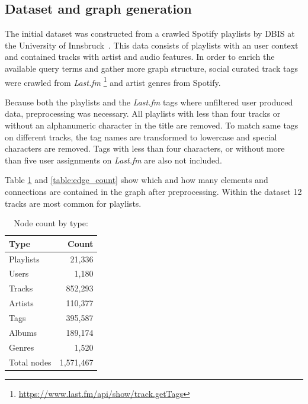 \documentclass[sigconf]{acmart}
\begin{document}
\subsection{Dataset and graph generation}
The initial dataset was constructed from a crawled Spotify playlists by DBIS at the University of Innsbruck~\cite{pichl2017improving}. This data consists of playlists with an user context and contained tracks with artist and audio features. In order to enrich the available query terms and gather more graph structure, social curated track tags were crawled from \emph{Last.fm} \footnote{\url{https://www.last.fm/api/show/track.getTags}} and artist genres from Spotify.

Because both the playlists and the \emph{Last.fm} tags where unfiltered user produced data, preprocessing was necessary. All playlists with less than four tracks or without an alphanumeric character in the title are removed. To match same tags on different tracks, the tag names are transformed to lowercase and special characters are removed. Tags with less than four characters, or without more than five user assignments on \emph{Last.fm} are also not included.

Table \ref{table:node_count} and \ref{table:edge_count} show which and how many elements and connections are contained in the graph after preprocessing. Within the dataset 12 tracks are most common for playlists.

\begin{table}[H]
	\caption{Node count by type:}
	\label{table:node_count}
	\begin{tabular}{lr}
		\midrule 
		\textbf{Type} & \textbf{Count} \\ 
		\midrule 
		Playlists & 21,336  \\
		Users     & 1,180     \\
		Tracks    & 852,293 \\
		Artists   & 110,377  \\
		Tags      & 395,587    \\
		Albums    & 189,174    \\
		Genres	  & 1,520	\\
		\midrule 
		Total nodes & 1,571,467\\
		\bottomrule
	\end{tabular}
\end{table}
\end{document}
